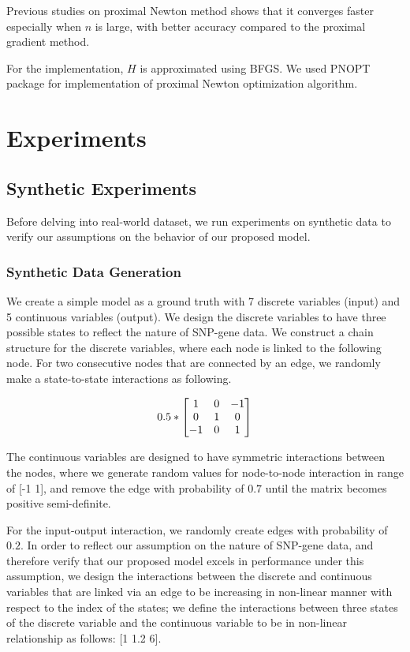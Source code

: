 \documentclass{article}
\begin{document}
Previous studies on proximal Newton method \cite{lee2012proximal} shows that it converges faster especially when $n$ is large, with better accuracy compared to the proximal gradient method.

For the implementation, $H$ is approximated using BFGS.
We used PNOPT package \cite{lee2012proximal} for implementation of proximal Newton optimization algorithm.



\section{Experiments}


\subsection{Synthetic Experiments}
Before delving into real-world dataset, we run experiments on synthetic data to verify our assumptions on the behavior of our proposed model.


\subsubsection{Synthetic Data Generation}
We create a simple model as a ground truth with 7 discrete variables (input) and 5 continuous variables (output).
We design the discrete variables to have three possible states to reflect the nature of SNP-gene data. We construct a chain structure for the discrete variables, where each node is linked to the following node. For two consecutive nodes that are connected by an edge, we randomly make a state-to-state interactions as following.

\begin{align*}
\centering
0.5 * 
\begin{bmatrix}
  1 & 0 & -1 \\
  0 & 1 & 0 \\
  -1 & 0 & 1
\end{bmatrix}
\end{align*}

The continuous variables are designed to have symmetric interactions between the nodes, where we generate random values for node-to-node interaction in range of [-1 1], and remove the edge with probability of $0.7$ until the matrix becomes positive semi-definite.

For the input-output interaction, we randomly create edges with probability of $0.2$. 
In order to reflect our assumption on the nature of SNP-gene data, and therefore verify that our proposed model excels in performance under this assumption, we design the interactions between the discrete and continuous variables that are linked via an edge to be increasing in non-linear manner with respect to the index of the states;
we define the interactions between three states of the discrete variable and the continuous variable to be in non-linear relationship as follows: [1 1.2 6].
\end{document}
